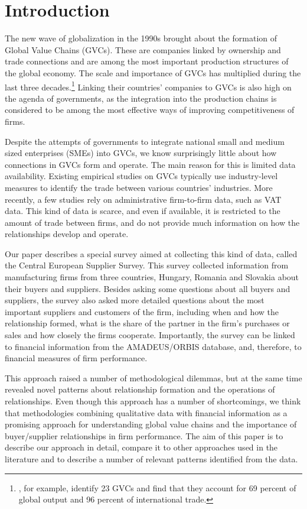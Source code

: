 \documentclass[final, dvipsnames, authoryear,12pt]{elsarticle}
\begin{document}
\section{Introduction}

The new wave of globalization in the 1990s brought about the formation of Global Value Chains (GVCs). These are companies linked by ownership and trade connections and are among the most important production structures of the global economy. The scale and importance of GVCs has multiplied during the last three decades.\footnote{\cite{mckinsey2019gvc}, for example, identify 23 GVCs and find that they account for 69 percent of global output and 96 percent of international trade.} Linking their countries' companies to GVCs is also high on the agenda of governments, as the integration into the production chains is considered to be among the most effective ways of improving competitiveness of firms.

Despite the attempts of governments to integrate national small and medium sized enterprises (SMEs) into GVCs, we know surprisingly little about how connections in GVCs form and operate. The main reason for this is limited data availability. Existing empirical studies on GVCs typically use industry-level measures to identify the trade between various countries' industries. More recently, a few studies rely on administrative firm-to-firm data, such as VAT data. This kind of data is scarce, and even if available, it is restricted to the amount of trade between firms, and do not provide much information on how the relationships develop and operate. 

Our paper describes a special survey aimed at collecting this kind of data, called the Central European Supplier Survey. This survey collected information from manufacturing firms from three countries, Hungary, Romania and Slovakia about their buyers and suppliers. Besides asking some questions about all buyers and suppliers, the survey also asked more detailed questions about the most important suppliers and customers of the firm, including when and how the relationship formed, what is the share of the partner in the firm's purchases or sales and how closely the firms cooperate. Importantly, the survey can be linked to financial information from the AMADEUS/ORBIS database, and, therefore, to financial measures of firm performance. 

This approach raised a number of methodological dilemmas, but at the same time revealed novel patterns about relationship formation and the operations of relationships. Even though this approach has a number of shortcomings, we think that methodologies combining qualitative data with financial information as a promising approach for understanding global value chains and the importance of buyer/supplier relationships in firm performance. The aim of this paper is to describe our approach in detail, compare it to other approaches used in the literature and to describe a number of relevant patterns identified from the data. 
\end{document}
